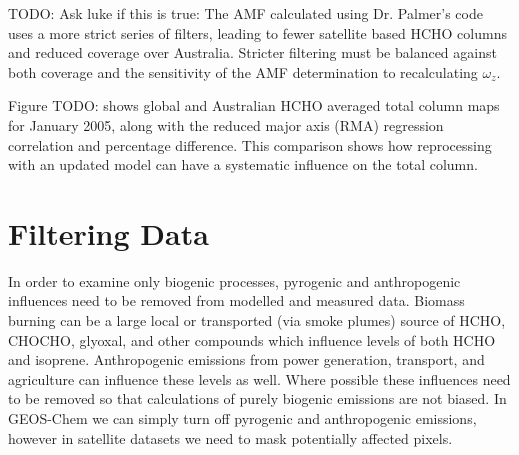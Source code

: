     
    TODO: Ask luke if this is true:
    The AMF calculated using Dr. Palmer's code uses a more strict series of filters, leading to fewer satellite based HCHO columns and reduced coverage over Australia.
    Stricter filtering must be balanced against both coverage and the sensitivity of the AMF determination to recalculating $\omega_z$.
  
    Figure TODO: shows global and Australian HCHO averaged total column maps for January 2005, along with the reduced major axis (RMA) regression correlation and percentage difference.
    This comparison shows how reprocessing with an updated model can have a systematic influence on the total column.
    
\section{Filtering Data}
  \label{Model:Filter}
  
  In order to examine only biogenic processes, pyrogenic and anthropogenic influences need to be removed from modelled and measured data.
  Biomass burning can be a large local or transported (via smoke plumes) source of HCHO, CHOCHO, glyoxal, and other compounds which influence levels of both HCHO and isoprene.
  Anthropogenic emissions from power generation, transport, and agriculture can influence these levels as well.
  Where possible these influences need to be removed so that calculations of purely biogenic emissions are not biased. 
  In GEOS-Chem we can simply turn off pyrogenic and anthropogenic emissions, however in satellite datasets we need to mask potentially affected pixels.
  
